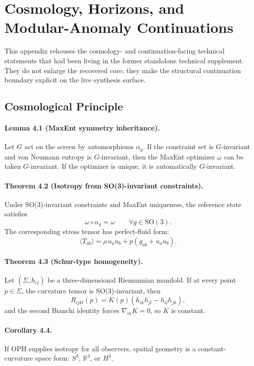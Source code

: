 \section{Cosmology, Horizons, and Modular-Anomaly Continuations}
\label{app:observers-cosmology-port}

This appendix rehouses the cosmology- and continuation-facing technical statements that had been
living in the former standalone technical supplement. They do not enlarge the recovered core; they
make the structural continuation boundary explicit on the live synthesis surface.

\subsection{Cosmological Principle}

\paragraph{\textbf{Lemma 4.1 (MaxEnt symmetry inheritance).}}
Let \(G\) act on the screen by automorphisms \(\alpha_g\). If the constraint set is
\(G\)-invariant and von Neumann entropy is \(G\)-invariant, then the MaxEnt optimizer \(\omega\)
can be taken \(G\)-invariant. If the optimizer is unique, it is automatically \(G\)-invariant.

\paragraph{\textbf{Theorem 4.2 (Isotropy from SO(3)-invariant constraints).}}
Under SO(3)-invariant constraints and MaxEnt uniqueness, the reference state satisfies
\[
\omega\circ\alpha_g=\omega
\qquad
\forall g\in \mathrm{SO}(3).
\]
The corresponding stress tensor has perfect-fluid form:
\[
\langle T_{ab}\rangle=\rho\,u_au_b+p(g_{ab}+u_au_b).
\]

\paragraph{\textbf{Theorem 4.3 (Schur-type homogeneity).}}
Let \((\Sigma,h_{ij})\) be a three-dimensional Riemannian manifold. If at every point
\(p\in\Sigma\), the curvature tensor is SO(3)-invariant, then
\[
R_{ijkl}(p)=K(p)(h_{ik}h_{jl}-h_{il}h_{jk}),
\]
and the second Bianchi identity forces \(\nabla_m K=0\), so \(K\) is constant.

\paragraph{\textbf{Corollary 4.4.}}
If OPH supplies isotropy for all observers, spatial geometry is a constant-curvature space form:
\(S^3\), \(\mathbb R^3\), or \(H^3\).

